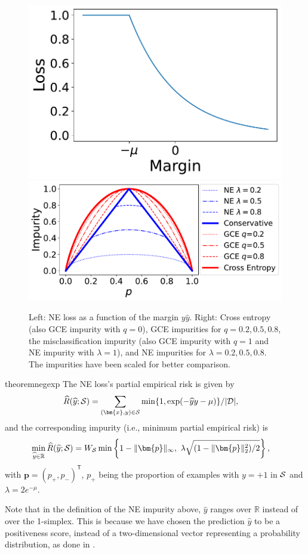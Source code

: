 \documentclass[letterpaper]{article} %
\newcommand{\R}{{\mathbb{R}}}
\newcommand{\bx}{{\bm{x}}}
\newcommand{\bp}{{\bm{p}}}
\newcommand{\T}{{\mathsf{T}}}
\newcommand{\cS}{{\cal{S}}}
\newcommand{\cD}{{\cal{D}}}
\newcommand{\WS}{{W_{\cal{S}}}}
\begin{document}
\begin{figure}[tb]
    \centering
    \includegraphics[height=0.27\linewidth]{figs/negexp.pdf}
    \includegraphics[height=0.27\linewidth]{figs/new_impurities.pdf}
    \caption{Left: NE loss as a function of the margin $y\widehat{y}$. 
		Right: Cross entropy (also GCE impurity with $q=0$),
  GCE impurities for $q=0.2, 0.5, 0.8$,
  the misclassification impurity (also GCE impurity with $q=1$ and NE impurity with $\lambda=1$), and
  NE impurities for $\lambda = 0.2, 0.5, 0.8$.
  The impurities have been scaled for better comparison.
  }
    \label{fig:neg-exp}
\end{figure}


\begin{restatable}{theorem}{negexp}
\label{thm:negexp}
	The NE loss's partial empirical risk is given by
	\begin{align*}
		\widehat{R}(\widehat{y};\cS) &= \sum_{(\bx,y)\in\cS} \min\{1,\exp(-\widehat{y}y-\mu)\}/|\cD|,  
	\end{align*}
	and the corresponding impurity (i.e., minimum partial empirical risk) is
	\begin{align*}
		\underset{\widehat{y}\in\R}{\min}\, \widehat{R}(\widehat{y};\cS) 
		&= \WS \min\left\{
			1-\|\bp\|_\infty,\ 
			\lambda
			\sqrt{(1-\|\bp\|_2^2)/2}
			\right\},
	\end{align*}
	with $\bp=(p_{+},p_{-})^\T$, $p_{+}$ being the proportion of examples with $y=+1$ in $\cS$ and 
 $\lambda=2e^{-\mu}$.
\end{restatable}
Note that in the definition of the NE impurity above, $\widehat{y}$ ranges over $\R$ instead 
of over the 1-simplex.
This is because we have chosen the prediction $\widehat{y}$ to be a positiveness score, instead of 
a two-dimensional vector representing a probability distribution, as done in 
\Cref{sec:background}.
\end{document}
